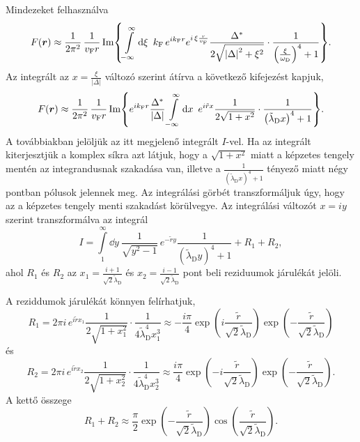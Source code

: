 \documentclass[a4paper,12pt,titlepage]{article}
\newcommand{\RR}{{\vb*{r}}}
\newcommand{\kF}{{k_\text{F}}}
\newcommand{\vF}{{v_\text{F}}}
\begin{document}
Mindezeket felhasználva
\begin{equation}
	F(\RR) \approx \frac{1}{2 \pi^2} \, \frac{1}{\vF r} \Im{ \int\limits_{-\infty}^\infty \dd{\xi} ~ \kF \, e^{i \kF r} e^{i \, \xi \frac{r}{\vF}} \frac{\Delta^*}{2 \sqrt{\left| \Delta \right|^2 + \xi^2}} \cdot \frac{1}{\left( \frac{\xi}{\omega_\text{D}} \right)^4 + 1} }.
\end{equation}
Az integrált az $x = \frac{\xi}{\left| \Delta \right|}$ változó szerint átírva a következő kifejezést kapjuk,
\begin{equation} \label{f-def}
	F(\RR) \approx \frac{1}{2 \pi^2} \, \frac{1}{\vF r} \Im{ e^{i \kF r} \frac{\Delta^*}{\left| \Delta \right|} \int\limits_{-\infty}^\infty \dd{x} ~ e^{i \tilde{r} x} \frac{1}{2 \sqrt{1 + x^2}} \cdot \frac{1}{\left( \tilde{\lambda}_\text{D} x \right)^4 + 1} }.
\end{equation}
A továbbiakban jelöljük az itt megjelenő integrált $I$-vel.  Ha az integrált kiterjesztjük a komplex síkra azt látjuk, hogy a $\sqrt{1 + x^2}$ miatt a képzetes tengely mentén az integrandusnak szakadása van, illetve a $\frac{1}{\left( \tilde{\lambda}_\text{D} x \right)^4 + 1}$ tényező miatt négy pontban pólusok jelennek meg.  Az integrálási görbét transzformáljuk úgy, hogy az a képzetes tengely menti szakadást körülvegye.  Az integrálási változót $x = i y$ szerint transzformálva az integrál
\begin{equation}
	I = \int\limits_1^\infty \dd{y} ~ \frac{1}{\sqrt{y^2 - 1}} \, e^{-\tilde{r} y} \frac{1}{\left( \tilde{\lambda}_\text{D} y \right)^4 + 1} + R_1 + R_2,
\end{equation}
ahol $R_1$ és $R_2$ az $x_1 = \frac{i + 1}{\sqrt{2} \tilde{\lambda}_\text{D}}$ és $x_2 = \frac{i - 1}{\sqrt{2} \tilde{\lambda}_\text{D}}$ pont beli reziduumok járulékát jelöli.

A reziddumok járulékát könnyen felírhatjuk,
\begin{equation}
	R_1 = 2 \pi i \, e^{i \tilde{r} x_1} \frac{1}{2 \sqrt{1 + x_1^2}} \cdot \frac{1}{4 \tilde{\lambda}_\text{D}^4 x_1^3} \approx -\frac{i \pi}{4} \exp(i \frac{\tilde{r}}{\sqrt{2} \tilde{\lambda}_\text{D}}) \exp(-\frac{\tilde{r}}{\sqrt{2} \tilde{\lambda}_\text{D}})
\end{equation}
és
\begin{equation}
	R_2 = 2 \pi i \, e^{i \tilde{r} x_2} \frac{1}{2 \sqrt{1 + x_2^2}} \cdot \frac{1}{4 \tilde{\lambda}_\text{D}^4 x_2^3} \approx \frac{i \pi}{4} \exp(-i \frac{\tilde{r}}{\sqrt{2} \tilde{\lambda}_\text{D}}) \exp(-\frac{\tilde{r}}{\sqrt{2} \tilde{\lambda}_\text{D}}).
\end{equation}
A kettő összege
\begin{equation}
	R_1 + R_2 \approx \frac{\pi}{2} \exp(-\frac{\tilde{r}}{\sqrt{2} \tilde{\lambda}_\text{D}}) \cos(\frac{\tilde{r}}{\sqrt{2} \tilde{\lambda}_\text{D}}).
\end{equation}
\end{document}
